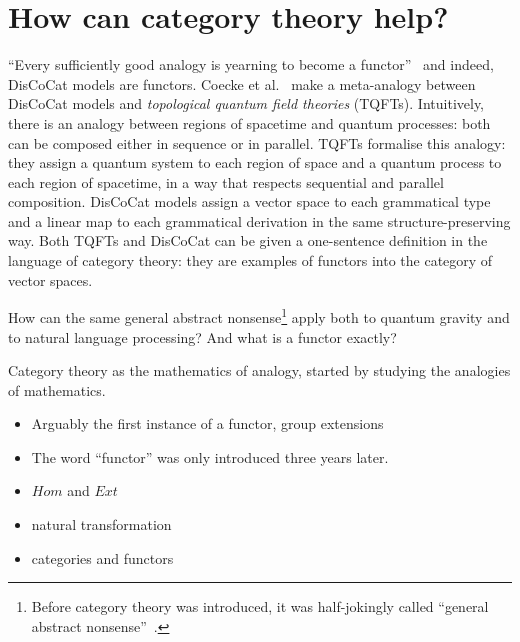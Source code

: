 
\section*{How can category theory help?}


``Every sufficiently good analogy is yearning to become a functor''~\cite{Baez06} and indeed, DisCoCat models are functors.
Coecke et al.~\cite{CoeckeEtAl13} make a meta-analogy between DisCoCat models and \emph{topological quantum field theories} (TQFTs).
Intuitively, there is an analogy between regions of spacetime and quantum processes: both can be composed either in sequence or in parallel.
TQFTs formalise this analogy: they assign a quantum system to each region of space and a quantum process to each region of spacetime, in a way that respects sequential and parallel composition.
DisCoCat models assign a vector space to each grammatical type and a linear map to each grammatical derivation in the same structure-preserving way.
Both TQFTs and DisCoCat can be given a one-sentence definition in the language of category theory: they are examples of functors into the category of vector spaces.

How can the same general abstract nonsense\footnote
{Before category theory was introduced, it was half-jokingly called ``general abstract nonsense''~\cite{Lane97}.}
apply both to quantum gravity and to natural language processing?
And what is a functor exactly?


Category theory as the mathematics of analogy, started by studying the analogies of mathematics.

\begin{itemize}
    \item Arguably the first instance of a functor, group extensions \cite{Baer34}
    \item The word ``functor'' \cite{Carnap37} was only introduced three years later.
    \item $Hom$ and $Ext$ \cite{EilenbergMacLane42a}
    \item natural transformation \cite{EilenbergMacLane42b}
    \item categories and functors \cite{EilenbergMacLane45}

\end{itemize}

